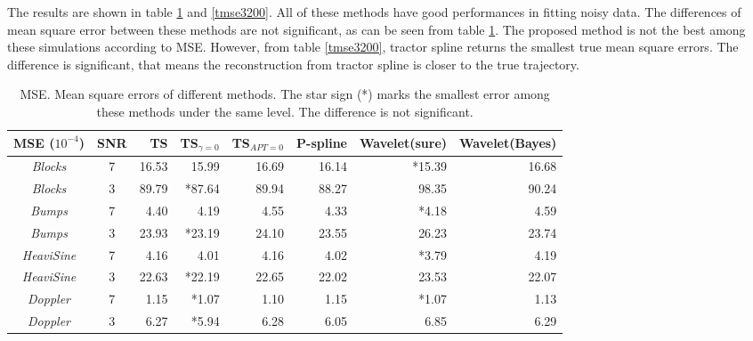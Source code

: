
The results are shown in table \ref{mse3200} and \ref{tmse3200}. All of these methods have good performances in fitting noisy data. The differences of mean square error between these methods are not significant, as can be seen from table \ref{mse3200}. The proposed method is not the best among these simulations according to MSE. However, from table \ref{tmse3200}, tractor spline returns the smallest true mean square errors. The difference is significant, that means the reconstruction from tractor spline is closer to the true trajectory. 
 
 \begin{table}
 	\centering
 	\caption{MSE. Mean square errors of different methods. The star sign (*) marks the smallest error among these methods under the same level. The difference is not significant.}\label{mse3200}
	\setlength\tabcolsep{1.5pt}
	\begin{tabular}{|c|c|r|r|r|r|r|r|}
\hline	MSE ($10^{-4}$)   & SNR & TS & TS$_{\gamma=0}$ & TS$_{APT=0}$  & P-spline & Wavelet(sure)& Wavelet(Bayes)\\ \hline
\textit{Blocks}    & 7   &  16.53& 15.99 & 16.69 & 16.14  & *15.39 & 16.68 \\ \hline
\textit{Blocks}    & 3   &  89.79 & *87.64 & 89.94  & 88.27 & 98.35 & 90.24 \\ \hline
\textit{Bumps}     & 7   & 4.40 & 4.19 & 4.55 & 4.33 & *4.18 & 4.59 \\ \hline
\textit{Bumps}     & 3   & 23.93 & *23.19 & 24.10 & 23.55 & 26.23 & 23.74 \\ \hline
\textit{HeaviSine} & 7   & 4.16 & 4.01 &4.16 & 4.02 & *3.79 & 4.19 \\ \hline
\textit{HeaviSine} & 3   & 22.63 & *22.19 & 22.65 & 22.02 & 23.53 & 22.07 \\ \hline
\textit{Doppler}   & 7   & 1.15 & *1.07 & 1.10 & 1.15  & *1.07 & 1.13  \\ \hline
\textit{Doppler}   & 3   & 6.27 & *5.94 &6.28 & 6.05  & 6.85 & 6.29  \\ \hline
	\end{tabular}
\end{table}

